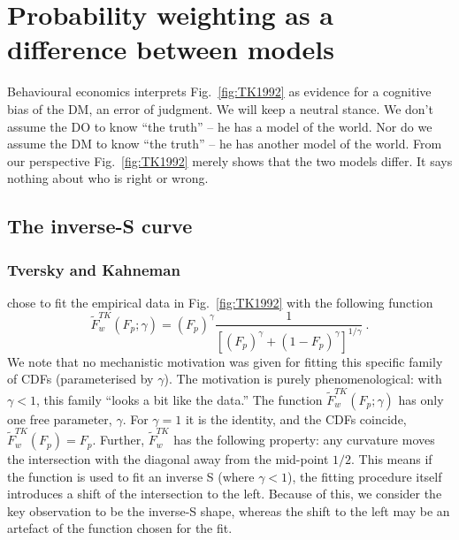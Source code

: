 \documentclass[a4paper, 12pt]{article}
\newcommand{\elabel}[1]{\label{eq:#1}}
\newcommand{\Eref}[1]{Equation~(\ref{eq:#1})}
\newcommand{\fref}[1]{Fig.~\ref{fig:#1}}
\newcommand{\seclabel}[1]{\label{sec:#1}}
\newcommand{\be}{\begin{equation}}
\newcommand{\ee}{\end{equation}}
\newcommand{\OP}[1]{{\it ***OP: #1 OP***}}
\begin{document}


\section{Probability weighting as a difference between models} \seclabel{ModelDiff}

Behavioural economics interprets \fref{TK1992} as evidence for a cognitive bias of the DM, an error of judgment. We will keep a neutral stance. We don't assume the DO to know ``the truth'' -- he has a model of the world. Nor do we assume the DM to know ``the truth'' -- he has another model of the world. From our perspective \fref{TK1992} merely shows that the two models differ. It says nothing about who is right or wrong.

\subsection{The inverse-S curve\seclabel{The_inverse}}
\subsubsection{Tversky and Kahneman}
\citet{TverskyKahneman1992} chose to fit the empirical data in \fref{TK1992} with the following function
% 
\be
\elabel{correspondence}
\tilde{F}^{TK}_w\left(F_p; \gamma\right) = \left(F_p\right)^\gamma \frac{1}{\left[\left(F_p\right)^\gamma+\left(1-F_p\right)^\gamma\right]^{1/\gamma}} ~.
\ee
We note that no mechanistic motivation was given for fitting this specific family of CDFs (parameterised by $\gamma$). The motivation is purely phenomenological: with $\gamma<1$, this family ``looks a bit like the data.''
% 
The function $\tilde{F}^{TK}_w\left(F_p; \gamma \right)$ has only one free parameter, $\gamma$. For $\gamma=1$ it is the identity, and the CDFs coincide, $\tilde{F}^{TK}_w\left(F_p\right)=F_p$. Further, $\tilde{F}^{TK}_w$ has the following property: any curvature moves the intersection with the diagonal away from the mid-point $1/2$. This means if the function is used to fit an inverse S (where $\gamma<1$), the fitting procedure itself introduces a shift of the intersection to the left. Because of this, we consider the key observation to be the inverse-S shape, whereas the shift to the left may be an artefact of the function chosen for the fit. 
\end{document}
